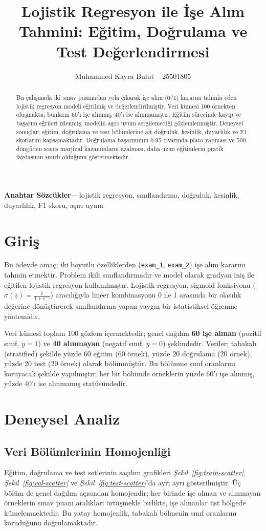 \documentclass[10pt,twocolumn]{article}
\title{Lojistik Regresyon ile İşe Alım Tahmini: Eğitim, Doğrulama ve Test Değerlendirmesi}
\author{Muhammed Kayra Bulut -- 25501805}
\date{}
\begin{document}
\maketitle

\begin{abstract}
\noindent Bu çalışmada iki sınav puanından yola çıkarak işe alım (0/1) kararını tahmin eden lojistik regresyon modeli eğitilmiş ve değerlendirilmiştir. Veri kümesi 100 örnekten oluşmakta; bunların 60'ı işe alınmış, 40'ı ise alınmamıştır. Eğitim sürecinde kayıp ve başarım eğrileri izlenmiş, modelin aşırı uyum sergilemediği gözlemlenmiştir. Deneysel sonuçlar; eğitim, doğrulama ve test bölümlerine ait doğruluk, kesinlik, duyarlılık ve F1 skorlarını kapsamaktadır. Doğrulama başarımının 0.95 civarında plato yapması ve 500. döngüden sonra marjinal kazanımların azalması, daha uzun eğitimlerin pratik faydasının sınırlı olduğunu göstermektedir.
\end{abstract}

\textbf{Anahtar Sözcükler---}lojistik regresyon, sınıflandırma, doğruluk, kesinlik, duyarlılık, F1 skoru, aşırı uyum

\section{Giriş}
Bu ödevde amaç; iki boyutlu özelliklerden (\texttt{exam\_1}, \texttt{exam\_2}) işe alım kararını tahmin etmektir. Problem ikili sınıflandırmadır ve model olarak gradyan iniş ile eğitilen lojistik regresyon kullanılmıştır. Lojistik regresyon, sigmoid fonksiyonu ($\sigma(z) = \frac{1}{1 + e^{-z}}$) aracılığıyla lineer kombinasyonu 0 ile 1 arasında bir olasılık değerine dönüştürerek sınıflandırma yapan yaygın bir istatistiksel öğrenme yöntemidir.

Veri kümesi toplam 100 gözlem içermektedir; genel dağılım \textbf{60 işe alınan} (pozitif sınıf, $y=1$) ve \textbf{40 alınmayan} (negatif sınıf, $y=0$) şeklindedir. Veriler; tabakalı (stratified) şekilde yüzde 60 eğitim (60 örnek), yüzde 20 doğrulama (20 örnek), yüzde 20 test (20 örnek) olarak bölünmüştür. Bu bölünme sınıf oranlarını koruyacak şekilde yapılmıştır; her bir bölümde örneklerin yüzde 60'ı işe alınmış, yüzde 40'ı ise alınmamış statüsündedir.

\section{Deneysel Analiz}
\subsection{Veri Bölümlerinin Homojenliği}
Eğitim, doğrulama ve test setlerinin saçılım grafikleri \emph{Şekil~\ref{fig:train-scatter}}, \emph{Şekil~\ref{fig:val-scatter}} ve \emph{Şekil~\ref{fig:test-scatter}}'da ayrı ayrı gösterilmiştir. Üç bölüm de genel dağılım açısından homojendir; her birinde işe alınan ve alınmayan örneklerin sınav puanı aralıkları örtüşmekle birlikte, işe alınanlar üst bölgede kümelenmektedir. Bu yatay homojenlik, tabakalı bölmenin sınıf oranlarını koruduğunu doğrulamaktadır.
\end{document}
